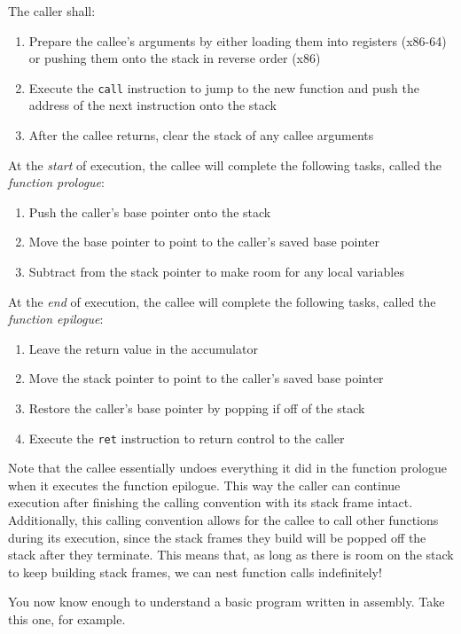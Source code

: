 \documentclass{article}
\begin{document}
The caller shall:
\begin{enumerate}
    \item Prepare the callee's arguments by either loading them into registers
        (x86-64) or pushing them onto the stack in reverse order (x86)
    \item Execute the \texttt{call} instruction to jump to the new function and
        push the address of the next instruction onto the stack
    \item After the callee returns, clear the stack of any callee arguments
\end{enumerate}

At the \emph{start} of execution, the callee will complete the following tasks,
called the \emph{function prologue}:
\begin{enumerate}
    \item Push the caller's base pointer onto the stack
    \item Move the base pointer to point to the caller's saved base pointer
    \item Subtract from the stack pointer to make room for any local variables
\end{enumerate}

At the \emph{end} of execution, the callee will complete the following tasks,
called the \emph{function epilogue}:
\begin{enumerate}
    \item Leave the return value in the accumulator
    \item Move the stack pointer to point to the caller's saved base pointer
    \item Restore the caller's base pointer by popping if off of the stack
    \item Execute the \texttt{ret} instruction to return control to the caller
\end{enumerate}

Note that the callee essentially undoes everything it did in the function
prologue when it executes the function epilogue. This way the caller can
continue execution after finishing the calling convention with its stack frame
intact. Additionally, this calling convention allows for the callee to call
other functions during its execution, since the stack frames they build will be
popped off the stack after they terminate. This means that, as long as there is
room on the stack to keep building stack frames, we can nest function calls
indefinitely!

You now know enough to understand a basic program written in assembly. Take this
one, for example.
\end{document}
